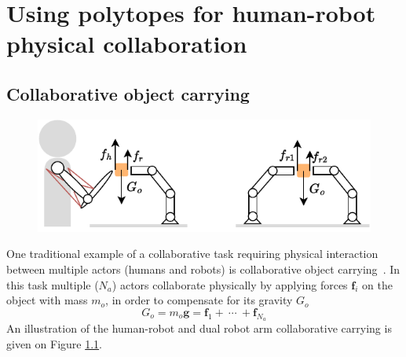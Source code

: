 
\chapter{Using polytopes for human-robot physical collaboration}



\section{Collaborative object carrying}


\begin{figure}[!h]
    \centering
    \includegraphics[width=0.6\linewidth]{Papers/images/carrying_schema.pdf}
    \caption{}
    \label{fig:carrying_schema}
\end{figure}

One traditional example of a collaborative task requiring physical interaction between multiple actors (humans and robots) is collaborative object carrying~\cite{Arai2000carrying,Kosuge1997carrying,Tsumugiwa2002carrying}. In this task multiple ($N_a$) actors collaborate physically by applying forces $\bm{f}_i$ on the object with mass $m_o$, in order to compensate for its gravity $G_o$
\begin{equation}
    G_o=m_o\bm{g}=\bm{f}_1 + ~\cdots ~+\bm{f}_{N_a}
\end{equation}
An illustration of the human-robot and dual robot arm collaborative carrying is given on Figure \ref{fig:carrying_schema}. 




